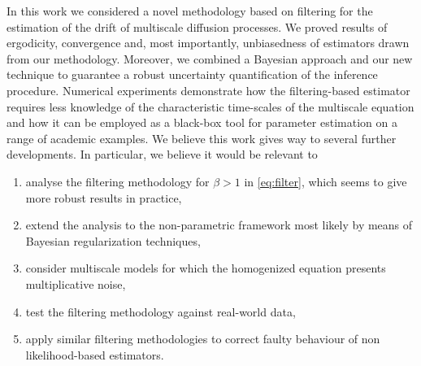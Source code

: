 \documentclass[review,onefignum,onetabnum]{siamonline190516}
\begin{document}
In this work we considered a novel methodology based on filtering for the estimation of the drift of multiscale diffusion processes. We proved results of ergodicity, convergence and, most importantly, unbiasedness of estimators drawn from our methodology. Moreover, we combined a Bayesian approach and our new technique to guarantee a robust uncertainty quantification of the inference procedure. Numerical experiments demonstrate how the filtering-based estimator requires less knowledge of the characteristic time-scales of the multiscale equation and how it can be employed as a black-box tool for parameter estimation on a range of academic examples. We believe this work gives way to several further developments. In particular, we believe it would be relevant to 
\begin{enumerate}
	\item analyse the filtering methodology for $\beta > 1$ in \eqref{eq:filter}, which seems to give more robust results in practice,
	\item extend the analysis to the non-parametric framework most likely by means of Bayesian regularization techniques,
	\item consider multiscale models for which the homogenized equation presents multiplicative noise,
	\item test the filtering methodology against real-world data,
	\item apply similar filtering methodologies to correct faulty behaviour of non likelihood-based estimators.
\end{enumerate} 
\end{document}
